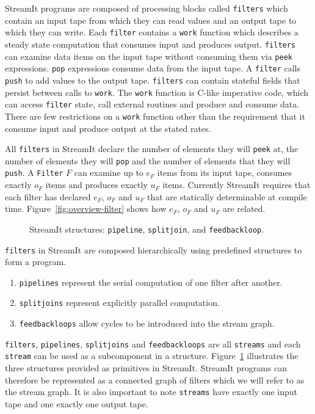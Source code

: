 StreamIt programs are composed of processing blocks called {\tt filters} which
contain an input tape from which they can read values and an output tape to which
they can write. Each {\tt filter} contains a {\tt work} function which describes 
a steady state computation that consumes input and produces output.
{\tt filters } can examine data items  on the input tape without consuming them 
via {\tt peek} expressions. {\tt pop} expressions consume data from the input
tape. A {\tt filter} calls {\tt push} to add values to the output tape.
{\tt filters} can contain stateful fields that persist between calls to {\tt work}. 
The {\tt work} function is C-like imperative code, 
which can access {\tt filter} state, call external routines and produce and consume data. 
There are few restrictions on a {\tt work} function other than the requirement that
it consume input and produce output at the stated rates.

All {\tt filters} in StreamIt declare the number of elements they
will {\tt peek} at, the number of elements they will {\tt pop} and the number
of elements that they will {\tt push}. A {\tt Filter} $F$ can examine up to $e_F$ 
items from its input tape, consumes exactly $o_F$ items and produces exactly
$u_F$ items. Currently StreamIt requires that each filter has declared $e_F$, $o_F$ 
and $u_F$ that are statically determinable at compile time. 
Figure~\ref{fig:overview-filter} shows how $e_F$, $o_F$ and $u_F$ are related.

\begin{figure}
\center
\epsfxsize=3.0in
\caption{StreamIt structures: {\tt pipeline}, {\tt splitjoin}, and {\tt feedbackloop}.}
\label{fig:structures}
\end{figure}

{\tt filters} in StreamIt are composed hierarchically using predefined structures to form
a program. 

\begin{enumerate}
\item {\tt pipelines} represent the serial computation of one filter after another.
\item {\tt splitjoins} represent explicitly parallel computation. 
\item {\tt feedbackloops} allow cycles to be introduced into the stream graph. 
\end{enumerate}

{\tt filters}, {\tt pipelines}, {\tt splitjoins} and {\tt feedbackloops} 
are all {\tt streams} and each {\tt stream} can be used as a subcomponent in 
a structure. Figure~\ref{fig:structures} illustrates the three structures 
provided as primitives in StreamIt.
StreamIt programs can therefore be represented as a connected graph of filters 
which we will refer to as the stream graph. It is also important to note
{\tt streams} have exactly one input tape and one exactly one output tape.

